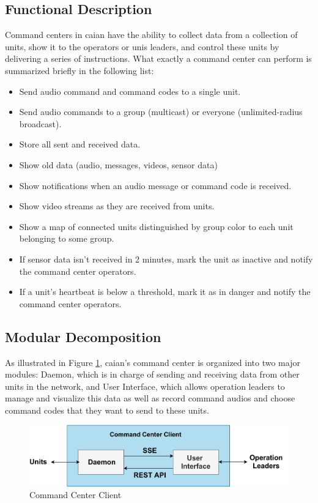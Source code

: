 \subsection{Functional Description}
Command centers in \acrshort{caian} have the ability to collect data from a collection of units, show it to the operators or unis leaders, and control these units by delivering a series of instructions.
What exactly a command center can perform is summarized briefly in the following list:
\begin{itemize}[itemsep=1pt, topsep=5pt]
\item Send audio command and command codes to a single unit.
\item Send audio commands to a group (multicast) or everyone (unlimited-radius broadcast).
\item Store all sent and received data.
\item Show old data (audio, messages, videos, sensor data)
\item Show notifications when an audio message or command code is received.
\item Show video streams as they are received from units.
\item Show a map of connected units distinguished by group color to each unit belonging to some group.
\item If sensor data isn’t received in 2 minutes, mark the unit as inactive and notify the command center operators.
\item  If a unit’s heartbeat is below a threshold, mark it as in danger and notify the command center operators.
\end{itemize} 

\subsection{Modular Decomposition}
As illustrated in Figure \ref{fig:cmd-center}, \acrshort{caian}'s command center is organized into two major modules: Daemon, which is in charge of sending and receiving data from other units in the network, and User Interface, which allows operation leaders to manage and visualize this data as well as record command audios and choose command codes that they want to send to these units.

\begin{figure}[!htb]
    \centering
    \includegraphics[width=\linewidth]{images/command-center.png}
    \caption{Command Center Client}
    \label{fig:cmd-center}
\end{figure}

